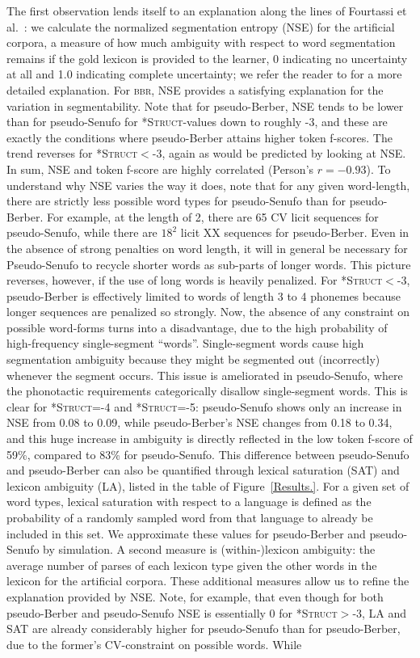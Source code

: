 \documentclass[11pt]{article}
\begin{document}
The first observation lends itself to an explanation along the lines of Fourtassi et al.~: we calculate the normalized segmentation entropy (NSE) for the artificial corpora, a measure of how much ambiguity with respect to word segmentation remains if the gold lexicon is provided to the learner, 0 indicating no uncertainty at all and 1.0 indicating complete uncertainty; we refer the reader to \cite{Fourtassi13a} for a more detailed explanation. For \textsc{bbr}, NSE provides a satisfying explanation for the variation in segmentability. Note that for pseudo-Berber, NSE tends to be lower than for pseudo-Senufo for \textsc{*Struct}-values down to roughly -3, and these are exactly the conditions where pseudo-Berber attains higher token f-scores. The trend reverses for \textsc{*Struct}$<$-3, again as would be predicted by looking at NSE. In sum, NSE and token f-score are highly correlated (Person's $r = -0.93$). To understand why NSE varies the way it does, note that for any given word-length, there are strictly less possible word types for pseudo-Senufo than for pseudo-Berber. For example, at the length of 2, there are 65 CV licit sequences for pseudo-Senufo, while there are $18^2$ licit XX sequences for pseudo-Berber. Even in the absence of strong penalties on word length, it will in general be necessary for Pseudo-Senufo to recycle shorter words as sub-parts of longer words.  This picture reverses, however, if the use of long words is heavily penalized. For \textsc{*Struct}$<$-3, pseudo-Berber is effectively limited to words of length 3 to 4 phonemes because longer sequences are penalized so strongly. Now, the absence of any constraint on possible word-forms turns into a disadvantage, due to the high probability of high-frequency single-segment ``words''. Single-segment words cause high segmentation ambiguity because they might be segmented out (incorrectly) whenever the segment occurs. This issue is ameliorated in pseudo-Senufo, where the phonotactic requirements categorically disallow single-segment words. This is clear for \textsc{*Struct}=-4 and \textsc{*Struct}=-5: pseudo-Senufo shows only an increase in NSE from 0.08 to 0.09, while pseudo-Berber's NSE changes from 0.18 to 0.34, and this huge increase in ambiguity is directly reflected in the low token f-score of 59\%, compared to 83\% for pseudo-Senufo. This difference between pseudo-Senufo and pseudo-Berber can also be quantified through lexical saturation (SAT) and lexicon ambiguity (LA), listed in the table of Figure~\ref{Results.}. For a given set of word types, lexical saturation with respect to a language is defined as the probability of a randomly sampled word from that language to already be included in this set. We approximate these values for pseudo-Berber and pseudo-Senufo by simulation. A second measure is (within-)lexicon ambiguity: the average number of parses of each lexicon type given the other words in the lexicon for the artificial corpora. These additional measures allow us to refine the explanation provided by NSE. Note, for example, that even though for both pseudo-Berber and pseudo-Senufo NSE is essentially 0 for \textsc{*Struct}$>$-3, LA and SAT are already considerably higher for pseudo-Senufo than for pseudo-Berber, due to the former's CV-constraint on possible words. While 
\end{document}
